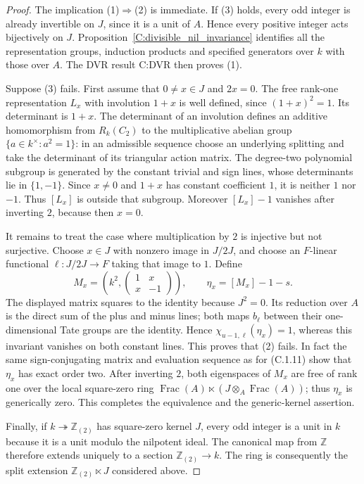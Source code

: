 \begin{proof}
The implication (1)$\Rightarrow$(2) is immediate. If (3) holds,
every odd integer is already invertible on $J$, since it is a unit
of $A$. Hence every positive integer acts bijectively on $J$.
Proposition~\ref{C:divisible_nil_invariance} identifies all the
representation groups, induction products and specified generators
over $k$ with those over $A$. The DVR result C:DVR then proves (1).

Suppose (3) fails. First assume that $0\ne x\in J$ and $2x=0$.
The free rank-one representation $L_x$ with involution $1+x$ is
well defined, since $(1+x)^2=1$. Its determinant is $1+x$.
The determinant of an involution defines an additive homomorphism
from $R_k(C_2)$ to the multiplicative abelian group
$\{a\in k^\times:a^2=1\}$: in an admissible sequence choose an
underlying splitting and take the determinant of its triangular
action matrix. The degree-two polynomial subgroup is generated
by the constant trivial and sign lines, whose determinants lie in
$\{1,-1\}$. Since $x\ne0$ and $1+x$ has constant coefficient $1$,
it is neither $1$ nor $-1$. Thus $[L_x]$ is outside that subgroup.
Moreover $[L_x]-1$ vanishes after inverting $2$, because then $x=0$.

It remains to treat the case where multiplication by $2$ is
injective but not surjective. Choose $x\in J$ with nonzero image
in $J/2J$, and choose an $F$-linear functional
$\ell:J/2J\to F$ taking that image to $1$. Define
\[
 M_x=\left(k^2,
       \begin{pmatrix}1&x\\x&-1\end{pmatrix}\right),
 \qquad \eta_x=[M_x]-1-s.                            \tag{C.1.27}
\]
The displayed matrix squares to the identity because $J^2=0$.
Its reduction over $A$ is the direct sum of the plus and minus
lines; both maps $b_\ell$ between their one-dimensional Tate
groups are the identity. Hence
$\chi_{u-1,\ell}(\eta_x)=1$, whereas this invariant vanishes on
both constant lines. This proves that (2) fails. In fact the same
sign-conjugating matrix and evaluation sequence as for (C.1.11)
show that $\eta_x$ has exact order two.
After inverting $2$, both eigenspaces of $M_x$ are free of rank one
over the local square-zero ring $\operatorname{Frac}(A)\ltimes
(J\otimes_A\operatorname{Frac}(A))$; thus $\eta_x$ is generically
zero. This completes the equivalence and the generic-kernel assertion.

Finally, if $k\twoheadrightarrow\mathbb Z_{(2)}$ has square-zero
kernel $J$, every odd integer is a unit in $k$ because it is a unit
modulo the nilpotent ideal. The canonical map from $\mathbb Z$
therefore extends uniquely to a section
$\mathbb Z_{(2)}\to k$. The ring is consequently the split extension
$\mathbb Z_{(2)}\ltimes J$ considered above.
\end{proof}
